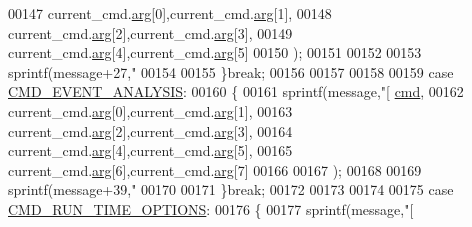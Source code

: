 \begin{DoxyCode}
{{{{{{{{{{00147                                     current\_cmd.\hyperlink{a00004_a56e6c2d7315d0ae60a51e8b140c9cfe4}{arg}[0],current\_cmd.\hyperlink{a00004_a56e6c2d7315d0ae60a51e8b140c9cfe4}{arg}[1],
00148                                     current\_cmd.\hyperlink{a00004_a56e6c2d7315d0ae60a51e8b140c9cfe4}{arg}[2],current\_cmd.\hyperlink{a00004_a56e6c2d7315d0ae60a51e8b140c9cfe4}{arg}[3],
00149                                     current\_cmd.\hyperlink{a00004_a56e6c2d7315d0ae60a51e8b140c9cfe4}{arg}[4],current\_cmd.\hyperlink{a00004_a56e6c2d7315d0ae60a51e8b140c9cfe4}{arg}[5]
00150                                     );
00151 
00152 
00153        sprintf(message+27,\textcolor{stringliteral}{"%
00154 
00155        \}\textcolor{keywordflow}{break};
00156 
00157 
00158 
00159        \textcolor{keywordflow}{case} \hyperlink{a00086_a3a15793e3ab7817f2429edf04de693a0}{CMD\_EVENT\_ANALYSIS}:
00160        \{
00161        sprintf(message,\textcolor{stringliteral}{"[%
      \hyperlink{a00004_af20664dc9ca2b752c73d524edee0e07a}{cmd},
00162                                     current\_cmd.\hyperlink{a00004_a56e6c2d7315d0ae60a51e8b140c9cfe4}{arg}[0],current\_cmd.\hyperlink{a00004_a56e6c2d7315d0ae60a51e8b140c9cfe4}{arg}[1],
00163                                     current\_cmd.\hyperlink{a00004_a56e6c2d7315d0ae60a51e8b140c9cfe4}{arg}[2],current\_cmd.\hyperlink{a00004_a56e6c2d7315d0ae60a51e8b140c9cfe4}{arg}[3],
00164                                     current\_cmd.\hyperlink{a00004_a56e6c2d7315d0ae60a51e8b140c9cfe4}{arg}[4],current\_cmd.\hyperlink{a00004_a56e6c2d7315d0ae60a51e8b140c9cfe4}{arg}[5],
00165                                     current\_cmd.\hyperlink{a00004_a56e6c2d7315d0ae60a51e8b140c9cfe4}{arg}[6],current\_cmd.\hyperlink{a00004_a56e6c2d7315d0ae60a51e8b140c9cfe4}{arg}[7]
00166 
00167                                     );
00168 
00169        sprintf(message+39,\textcolor{stringliteral}{"%
00170 
00171        \}\textcolor{keywordflow}{break};
00172 
00173 
00174 
00175    \textcolor{keywordflow}{case} \hyperlink{a00086_a1d8673a7ca545f3e382fc538f543ab72}{CMD\_RUN\_TIME\_OPTIONS}:
00176        \{
00177        sprintf(message,\textcolor{stringliteral}{"[%
}}}}}}}}}}}}}}
\end{DoxyCode}
